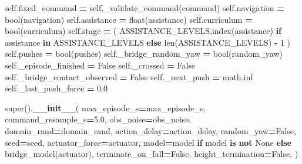 \documentclass[
  chinese,
  11pt,
  letterpaper,
]{article}
\newenvironment{Shaded}{\begin{snugshade}}{\end{snugshade}}
\newcommand{\BuiltInTok}[1]{#1}
\newcommand{\ControlFlowTok}[1]{\textcolor[rgb]{0.13,0.29,0.53}{\textbf{#1}}}
\newcommand{\DecValTok}[1]{\textcolor[rgb]{0.00,0.00,0.81}{#1}}
\newcommand{\FloatTok}[1]{\textcolor[rgb]{0.00,0.00,0.81}{#1}}
\newcommand{\FunctionTok}[1]{\textcolor[rgb]{0.13,0.29,0.53}{\textbf{#1}}}
\newcommand{\KeywordTok}[1]{\textcolor[rgb]{0.13,0.29,0.53}{\textbf{#1}}}
\newcommand{\NormalTok}[1]{#1}
\newcommand{\OperatorTok}[1]{\textcolor[rgb]{0.81,0.36,0.00}{\textbf{#1}}}
\newcommand{\VariableTok}[1]{\textcolor[rgb]{0.00,0.00,0.00}{#1}}
\renewenvironment{Shaded}{\par\smallskip}{\par\smallskip}
\begin{document}
\begin{Shaded}
\begin{Highlighting}[]
        \VariableTok{self}\NormalTok{.fixed\_command }\OperatorTok{=} \VariableTok{self}\NormalTok{.\_validate\_command(command)}
        \VariableTok{self}\NormalTok{.navigation }\OperatorTok{=} \BuiltInTok{bool}\NormalTok{(navigation)}
        \VariableTok{self}\NormalTok{.assistance }\OperatorTok{=} \BuiltInTok{float}\NormalTok{(assistance)}
        \VariableTok{self}\NormalTok{.curriculum }\OperatorTok{=} \BuiltInTok{bool}\NormalTok{(curriculum)}
        \VariableTok{self}\NormalTok{.stage }\OperatorTok{=}\NormalTok{ (}
\NormalTok{            ASSISTANCE\_LEVELS.index(assistance)}
            \ControlFlowTok{if}\NormalTok{ assistance }\KeywordTok{in}\NormalTok{ ASSISTANCE\_LEVELS}
            \ControlFlowTok{else} \BuiltInTok{len}\NormalTok{(ASSISTANCE\_LEVELS) }\OperatorTok{{-}} \DecValTok{1}
\NormalTok{        )}
        \VariableTok{self}\NormalTok{.pushes }\OperatorTok{=} \BuiltInTok{bool}\NormalTok{(pushes)}
        \VariableTok{self}\NormalTok{.\_bridge\_random\_yaw }\OperatorTok{=} \BuiltInTok{bool}\NormalTok{(random\_yaw)}
        \VariableTok{self}\NormalTok{.\_episode\_finished }\OperatorTok{=} \VariableTok{False}
        \VariableTok{self}\NormalTok{.\_crossed }\OperatorTok{=} \VariableTok{False}
        \VariableTok{self}\NormalTok{.\_bridge\_contact\_observed }\OperatorTok{=} \VariableTok{False}
        \VariableTok{self}\NormalTok{.\_next\_push }\OperatorTok{=}\NormalTok{ math.inf}
        \VariableTok{self}\NormalTok{.\_last\_push\_force }\OperatorTok{=} \FloatTok{0.0}

        \BuiltInTok{super}\NormalTok{().}\FunctionTok{\_\_init\_\_}\NormalTok{(}
\NormalTok{            max\_episode\_s}\OperatorTok{=}\NormalTok{max\_episode\_s,}
\NormalTok{            command\_resample\_s}\OperatorTok{=}\FloatTok{5.0}\NormalTok{,}
\NormalTok{            obs\_noise}\OperatorTok{=}\NormalTok{obs\_noise,}
\NormalTok{            domain\_rand}\OperatorTok{=}\NormalTok{domain\_rand,}
\NormalTok{            action\_delay}\OperatorTok{=}\NormalTok{action\_delay,}
\NormalTok{            random\_yaw}\OperatorTok{=}\VariableTok{False}\NormalTok{,}
\NormalTok{            seed}\OperatorTok{=}\NormalTok{seed,}
\NormalTok{            actuator\_force}\OperatorTok{=}\NormalTok{actuator,}
\NormalTok{            model}\OperatorTok{=}\NormalTok{model }\ControlFlowTok{if}\NormalTok{ model }\KeywordTok{is} \KeywordTok{not} \VariableTok{None} \ControlFlowTok{else}\NormalTok{ bridge\_model(actuator),}
\NormalTok{            terminate\_on\_fall}\OperatorTok{=}\VariableTok{False}\NormalTok{,}
\NormalTok{            height\_termination}\OperatorTok{=}\VariableTok{False}\NormalTok{,}
\NormalTok{        )}


\end{Highlighting}
\end{Shaded}
\end{document}

